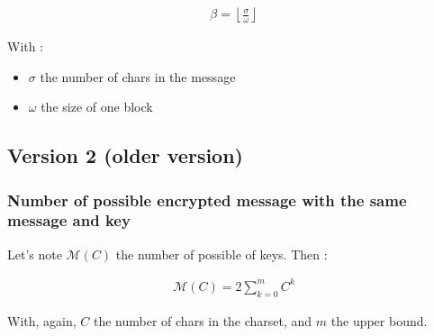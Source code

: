 \begin{large}
\begin{align}
    \beta = \left\lfloor \frac{\sigma}{\omega} \right\rfloor
\end{align}
\end{large}
With :
\begin{itemize}
    \item $\sigma$ the number of chars in the message
    \item $\omega$ the size of one block
\end{itemize}


\subsection{Version 2 (older version)}

\subsubsection{Number of possible encrypted message with the same message and key}

Let's note $\mathcal{M}(C)$ the number of possible of keys. Then :
\begin{large}
\begin{align}
    \mathcal{M}(C) = 2 \sum_{k=0}^{m}{C^k} 
\end{align}
\end{large}
With, again, $C$ the number of chars in the charset, and $m$ the upper bound.